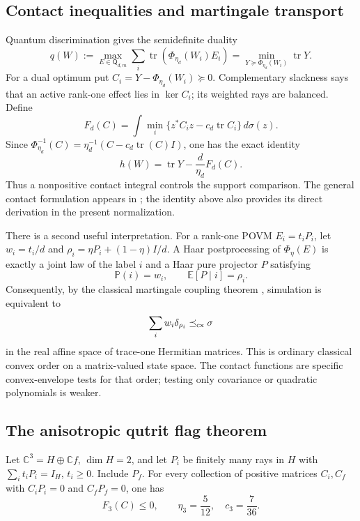 \subsection{Contact inequalities and martingale transport}
\label{geo:contact}

Quantum discrimination gives the semidefinite duality
\[
 q(W):=\max_{E\in\mathsf Q_{d,m}}
              \sum_i\operatorname{tr}(\Phi_{\eta_d}(W_i)E_i)
       =\min_{Y\succeq\Phi_{\eta_d}(W_i)}\operatorname{tr}Y.
\]
For a dual optimum put \(C_i=Y-\Phi_{\eta_d}(W_i)\succeq0\).
Complementary slackness says that an active rank-one effect lies in
\(\ker C_i\); its weighted rays are balanced. Define
\[
 F_d(C)=\int\min_i
       \{z^*C_i z-c_d\operatorname{tr}C_i\}\,d\sigma(z).
\]
Since
\(\Phi_{\eta_d}^{-1}(C)=
\eta_d^{-1}(C-c_d\operatorname{tr}(C)I)\), one has the exact identity
\begin{equation}
 h(W)=\operatorname{tr}Y-\frac d{\eta_d}F_d(C).
 \label{geo:contact-identity}
\end{equation}
Thus a nonpositive contact integral controls the support comparison.
The general contact formulation appears in
\cite[Corollary 2, Eq.~(35)]{geo_yzhang2026}; the identity above also
provides its direct derivation in the present normalization.

There is a second useful interpretation. For a rank-one POVM
\(E_i=t_iP_i\), let \(w_i=t_i/d\) and
\(\rho_i=\eta P_i+(1-\eta)I/d\).
A Haar postprocessing of \(\Phi_\eta(E)\) is exactly a joint law of
the label \(i\) and a Haar pure projector \(P\) satisfying
\[
 \mathbb P(i)=w_i,\qquad \mathbb E[P\mid i]=\rho_i.
\]
Consequently, by the classical martingale coupling theorem
\cite{geo_strassen1965}, simulation is equivalent to
\[
 \sum_iw_i\delta_{\rho_i}\preceq_{\rm cx}\sigma
\]
in the real affine space of trace-one Hermitian matrices.
This is ordinary classical convex order on a matrix-valued state
space. The contact functions are specific convex-envelope tests for
that order; testing only covariance or quadratic polynomials is weaker.

\subsection{The anisotropic qutrit flag theorem}
\label{geo:flag}

\begin{theorem}
\label{geo:flag-theorem}
Let \(\mathbb C^3=H\oplus\mathbb Cf\), \(\dim H=2\), and let
\(P_i\) be finitely many rays in \(H\) with
\(\sum_i t_iP_i=I_H\), \(t_i\ge0\). Include \(P_f\).
For every collection of positive matrices \(C_i,C_f\) with
\(C_iP_i=0\) and \(C_fP_f=0\), one has
\[
 F_3(C)\le0,\qquad \eta_3=\frac5{12},\quad c_3=\frac7{36}.
\]
\end{theorem}


